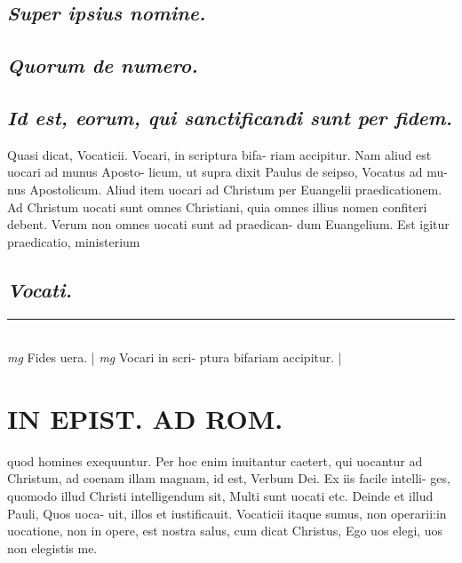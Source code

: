 \documentclass{article}
\begin{document}
\begin{pages}
\subsection*{\textit{Super ipsius nomine. }}
{}
\subsection*{\textit{Quorum de numero. }}
{}
\subsection*{\textit{Id est, eorum, qui sanctificandi sunt per fidem.  }}\pstart Quasi dicat, Vocaticii. Vocari, in scriptura bifa- riam accipitur. Nam aliud est uocari ad munus Aposto- licum, ut supra dixit Paulus de seipso, Vocatus ad mu- nus Apostolicum. Aliud item uocari ad Christum per Euangelii praedicationem. Ad Christum uocati sunt omnes Christiani, quia omnes illius nomen confiteri debent. Verum non omnes uocati sunt ad praedican- dum Euangelium. Est igitur praedicatio, ministerium  \pend
{}
{}
\subsection*{\textit{Vocati. }}
\vspace{0.5cm}\noindent
\vspace{0.2cm}\rule{1cm}{0.2pt}\\ 
\hspace{0.2cm}\textit{mg}
\footnotesize Fides uera.  
\normalsize| 
\hspace{0.2cm}\textit{mg}
\footnotesize Vocari in scri- ptura bifariam accipitur.  
\normalsize| 
\section*{IN EPIST. AD ROM.  }
\marginpar{[ p.4 ]}\pstart quod homines exequuntur. Per hoc enim inuitantur caetert, qui uocantur ad Christum, ad coenam illam magnam, id est, Verbum Dei. Ex iis facile intelli- ges, quomodo illud Christi intelligendum sit, Multi sunt uocati etc. Deinde et illud Pauli, Quos uoca- uit, illos et iustificauit. Vocaticii itaque sumus, non operarii:in uocatione, non in opere, est nostra salus, cum dicat Christus, Ego uos elegi, uos non elegistis me.   \pend
{}
{}

\end{pages}
\end{document}
